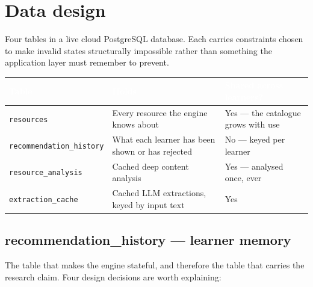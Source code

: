 \documentclass[11pt,a4paper]{article}
\newcommand{\code}[1]{\texttt{\small #1}}
\newcommand{\thead}[1]{\textcolor{white}{\bfseries\small #1}}
\newcommand{\headrow}{\rowcolor{navy}}
\begin{document}
\newpage
\section{Data design}

Four tables in a live cloud PostgreSQL database. Each carries constraints
chosen to make invalid states structurally impossible rather than something
the application layer must remember to prevent.

\vspace{4pt}
\begin{tabularx}{\textwidth}{>{\raggedright\arraybackslash}p{4.4cm} >{\raggedright\arraybackslash}X >{\raggedright\arraybackslash}p{4cm}}
\headrow \thead{Table} & \thead{Holds} & \thead{Shared across learners?} \\
\midrule
\code{resources} & Every resource the engine knows about & Yes --- the catalogue grows with use \\
\rowcolor{altshade} \code{recommendation\_history} & What each learner has been shown or has rejected & No --- keyed per learner \\
\code{resource\_analysis} & Cached deep content analysis & Yes --- analysed once, ever \\
\rowcolor{altshade} \code{extraction\_cache} & Cached LLM extractions, keyed by input text & Yes \\
\bottomrule
\end{tabularx}
\vspace{8pt}

\subsection{recommendation\_history --- learner memory}

The table that makes the engine stateful, and therefore the table that carries
the research claim. Four design decisions are worth explaining:
\end{document}
